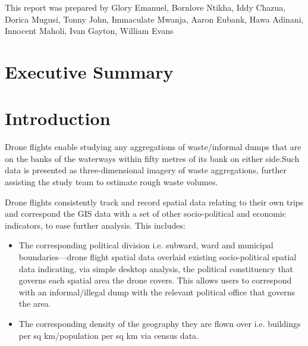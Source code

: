 \documentclass[a4paper,12pt,twoside]{article}
\begin{document}
\bigskip \bigskip \bigskip \bigskip \bigskip \bigskip \bigskip \bigskip \bigskip \bigskip
\bigskip \bigskip \bigskip \bigskip \bigskip \bigskip \bigskip \bigskip \bigskip \bigskip \bigskip \bigskip \bigskip \bigskip \bigskip

This report was prepared by Glory Emanuel, Bornlove Ntikha, Iddy Chazua, Dorica Mugusi, Tonny John, Immaculate Mwanja, Aaron Eubank, Hawa Adinani, Innocent Maholi, Ivan Gayton, William Evans


\newpage
\tableofcontents

\newpage
\section{Executive Summary}

    \begin{multicols}{2}
    \lipsum[0-3]
    \end{multicols}

\section{Introduction}

    \lipsum[0-4]
  
    Drone flights enable studying any aggregations of waste/informal dumps that are on the banks of the waterways within fifty metres of its bank on either side.Such data is presented as three-dimensional imagery of waste aggregations, further assisting the study team to estimate rough waste volumes.
    
    Drone flights consistently track and record spatial data relating to their own trips and correspond the GIS data with a set of other socio-political and economic indicators, to ease further analysis. This includes:   
    
    \begin{itemize}
        \item The corresponding political division i.e. subward, ward and municipal boundaries—drone flight spatial data overlaid existing socio-political spatial data indicating, via simple desktop analysis, the political constituency that governs each spatial area the drone covers. This allows users to correspond with an informal/illegal dump with the relevant political office that governs the area.
        \item The corresponding density of the geography they are flown over i.e. buildings per sq km/population per sq km via census data. 
    \end{itemize}
    
\end{document}
